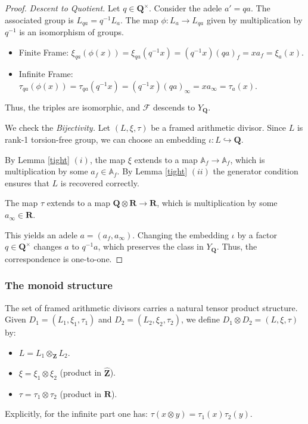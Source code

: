 \documentclass[11pt,a4paper]{article}
\newcommand{\Q}{\mathbf{Q}}
\newcommand{\Z}{\mathbf{Z}}
\newcommand{\R}{\mathbf{R}}
\newcommand{\Af}{\mathbb{A}_f}
\theoremstyle{plain}
\theoremstyle{definition} %
\begin{document}
\begin{proof}
\emph{Descent to Quotient.} 
Let $q \in \Q^\times$. Consider the adele $a' = qa$.
The associated group is $L_{qa} = q^{-1} L_a$.
The map $\phi: L_a \to L_{qa}$ given by multiplication by $q^{-1}$ is an isomorphism of groups.
\begin{itemize}[leftmargin=*, labelindent=0pt]
    \item[] Finite Frame: $\xi_{qa}(\phi(x)) = \xi_{qa}(q^{-1}x) = (q^{-1}x)(qa)_f = x a_f = \xi_a(x)$.
    \item[] Infinite Frame: $\tau_{qa}(\phi(x)) = \tau_{qa}(q^{-1}x) = (q^{-1}x)(qa)_\infty = x a_\infty = \tau_a(x)$.
\end{itemize}
Thus, the triples are isomorphic, and $\mathcal F$ descends to $Y_\Q$.\vspace{.03in}

We check the \emph{Bijectivity.}
Let $(L, \xi, \tau)$ be a framed arithmetic divisor.
Since $L$ is rank-1 torsion-free group, we can choose an embedding $\iota: L \hookrightarrow \Q$.

 By Lemma \ref{tight} $(i)$, the map $\xi$ extends to a map $\Af \to \Af$, which is multiplication by some $a_f \in \Af$. By Lemma \ref{tight} $(ii)$  the   generator condition ensures that $L$ is recovered correctly.
 
The map $\tau$ extends to a map $\Q \otimes \R \to \R$, which is multiplication by some $a_\infty \in \R$.

This yields an adele $a = (a_f, a_\infty)$.
Changing the embedding $\iota$ by a factor $q \in \Q^\times$ changes $a$ to $q^{-1}a$, which preserves the class in $Y_\Q$.
Thus, the correspondence is one-to-one.
\end{proof}

\subsubsection{The monoid structure}

The set of framed arithmetic divisors carries a natural tensor product structure.
Given $D_1 = (L_1, \xi_1, \tau_1)$ and $D_2 = (L_2, \xi_2, \tau_2)$, we define $D_1 \otimes D_2 = (L, \xi, \tau)$ by:
\begin{itemize}[leftmargin=*, labelindent=0pt]
    \item[] $L = L_1 \otimes_\Z L_2$.
    \item[] $\xi = \xi_1 \otimes \xi_2$ (product in $\widehat{\Z}$).
    \item[] $\tau = \tau_1 \otimes \tau_2$ (product in $\R$).
\end{itemize}
Explicitly, for the infinite part one has: $\tau(x \otimes y) = \tau_1(x) \tau_2(y)$.
\end{document}
